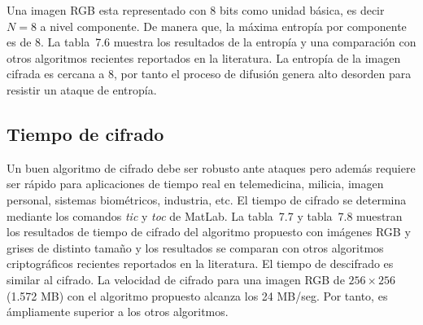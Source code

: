 Una imagen RGB esta representado con 8 bits como unidad básica, es decir $N=8$ a nivel componente. De manera que, la máxima entropía por componente es de 8. La tabla~7.6 muestra los resultados de la entropía y una comparación con otros algoritmos recientes reportados en la literatura. La entropía de la imagen cifrada es cercana a 8, por tanto el proceso de difusión genera alto desorden para resistir un ataque de entropía.

\begin{table}[!htbp] %
	\center
	\caption{Resultados de entropía y su comparación con otros algoritmos reportados en la literatura, donde NP significa que no presento.}
\end{table} 

\subsection{Tiempo de cifrado}
Un buen algoritmo de cifrado debe ser robusto ante ataques pero además requiere ser rápido para aplicaciones de tiempo real en telemedicina, milicia, imagen personal, sistemas biométricos, industria, etc. El tiempo de cifrado se determina mediante los comandos \textit{tic} y \textit{toc} de MatLab. La tabla~7.7 y tabla~7.8 muestran los resultados de tiempo de cifrado del algoritmo propuesto con imágenes RGB y grises de distinto tamaño y los resultados se comparan con otros algoritmos criptográficos recientes reportados en la literatura. El tiempo de descifrado es similar al cifrado. La velocidad de cifrado para una imagen RGB de $256\times 256$ (1.572 MB) con el algoritmo propuesto alcanza los 24 MB/seg. Por tanto, es ámpliamente superior a los otros algoritmos. 

